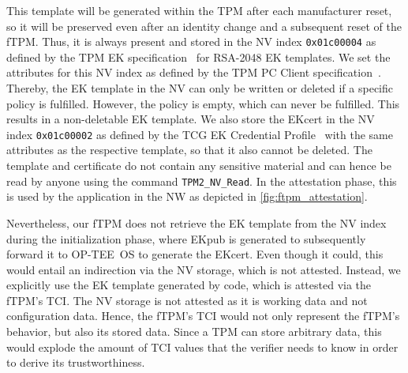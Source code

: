 This template will be generated within the TPM after each manufacturer reset, so it will be preserved even after an identity change and a subsequent reset of the \ac{fTPM}\@.
Thus, it is always present and stored in the NV index \texttt{0x01c00004} as defined by the TPM EK specification~\cite{tcg-ek} for RSA-2048 EK templates.
We set the attributes for this NV index as defined by the TPM PC Client specification~\cite{tcgPcClientTpmProfile}. %
Thereby, the EK template in the NV can only be written or deleted if a specific policy is fulfilled.
However, the policy is empty, which can never be fulfilled.
This results in a non-deletable EK template.
We also store the EKcert in the NV index \texttt{0x01c00002} as defined by the TCG EK Credential Profile~\cite{tcg-ek} with the same attributes as the respective template, so that it also cannot be deleted.
The template and certificate do not contain any sensitive material and can hence be read by anyone using the command \texttt{TPM2\_NV\_Read}.
In the attestation phase, this is used by the application in the \ac{NW} as depicted in \autoref{fig:ftpm_attestation}.

Nevertheless, our \ac{fTPM} does not retrieve the EK template from the NV index during the initialization phase, where EKpub is generated to subsequently forward it to OP-TEE~OS to generate the EKcert.
Even though it could, this would entail an indirection via the NV storage, which is not attested.
Instead, we explicitly use the EK template generated by code, which is attested via the fTPM's \ac{TCI}\@.
The NV storage is not attested as it is working data and not configuration data.
Hence, the fTPM's \ac{TCI} would not only represent the fTPM's behavior, but also its stored data.
Since a \ac{TPM} can store arbitrary data, this would explode the amount of TCI values that the verifier needs to know in order to derive its trustworthiness.



